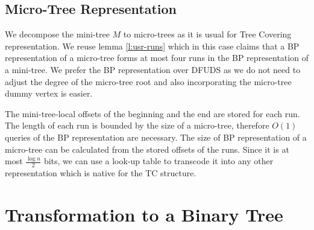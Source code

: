 \subsection{Micro-Tree Representation}

We decompose the mini-tree $M$ to micro-trees as it is usual for Tree Covering representation.
We reuse lemma \ref{l:usr-runs} which in this case claims that a BP representation of a micro-tree forms at most four runs in the BP representation of a mini-tree.
We prefer the BP representation over DFUDS as we do not need to adjust the degree of the micro-tree root and also incorporating the micro-tree dummy vertex is easier.

The mini-tree-local offsets of the beginning and the end are stored for each run.
The length of each run is bounded by the size of a micro-tree, therefore $O(1)$ queries of the BP representation are necessary.
The size of BP representation of a micro-tree can be calculated from the stored offsets of the runs.
Since it is at most $\frac{\log n}{2}$ bits, we can use a look-up table to transcode it into any other representation which is native for the TC structure.

\section{Transformation to a Binary Tree}

